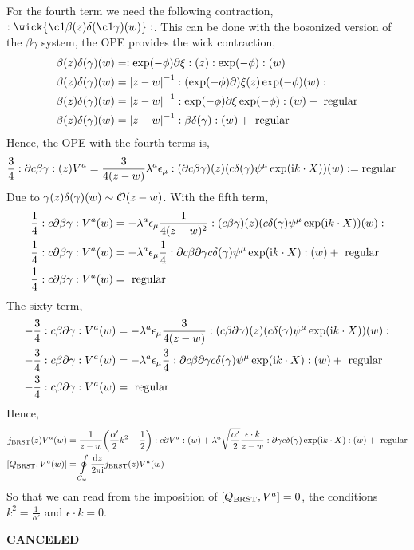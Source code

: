 For the fourth term we need the following contraction, $\cnord{\wick{\c1\beta(z)\delta\qty(\c1\gamma)(w)}}$. This can be done with the bosonized version 
of the $\beta\gamma$ system, the OPE provides the wick contraction,
\begin{align*}
    \beta(z)\delta\qty(\gamma)(w)&=:\exp(-\phi)\partial\xi:(z):\exp(-\phi):(w)\\
    \beta(z)\delta\qty(\gamma)(w)&=\abs{z-w}^{-1}:(\exp(-\phi)\partial)\xi(z)\exp(-\phi)(w):\\
    \beta(z)\delta\qty(\gamma)(w)&=\abs{z-w}^{-1}:\exp(-\phi)\partial\xi\exp(-\phi):(w)+\textnormal{ regular}\\
    \beta(z)\delta\qty(\gamma)(w)&=\abs{z-w}^{-1}:\beta\delta\qty(\gamma):(w)+\textnormal{ regular}
\end{align*}
Hence, the OPE with the fourth terms is,
\begin{align*}
    \frac34:\partial c\beta\gamma:(z)V^a&=\frac{3}{4(z-w)}\lambda^a\epsilon_\mu:(\partial c\beta\gamma)(z)(c\delta\qty(\gamma)\psi^\mu\exp(\textnormal{i} k\cdot X))(w):=\textnormal{regular}
\end{align*}
Due to $\gamma(z)\delta\qty(\gamma)(w)\sim\mathcal O\qty(z-w)$. With the fifth term,
\begin{align*}
    \frac14:c\partial\beta\gamma:V^a(w)&=-\lambda^a\epsilon_\mu\frac{1}{4(z-w)^2}:(c\beta\gamma)(z)(c\delta\qty(\gamma)\psi^\mu\exp(\textnormal{i} k\cdot X))(w):\\
    \frac14:c\partial\beta\gamma:V^a(w)&=-\lambda^a\epsilon_\mu\frac{1}{4}:\partial c\beta\partial\gamma c\delta\qty(\gamma)\psi^\mu\exp(\textnormal{i} k\cdot X):(w)+\textnormal{ regular}\\
    \frac14:c\partial\beta\gamma:V^a(w)&=\textnormal{ regular}
\end{align*}
The sixty term,
\begin{align*}
    -\frac34:c\beta\partial\gamma:V^a(w)&=-\lambda^a\epsilon_\mu\frac{3}{4(z-w)}:(c\beta\partial\gamma)(z)(c\delta\qty(\gamma)\psi^\mu\exp(\textnormal{i} k\cdot X))(w):\\
    -\frac34:c\beta\partial\gamma:V^a(w)&=-\lambda^a\epsilon_\mu\frac{3}{4}:\partial c\beta\partial\gamma c\delta\qty(\gamma)\psi^\mu\exp(\textnormal{i} k\cdot X):(w)+\textnormal{ regular}\\
    -\frac34:c\beta\partial\gamma:V^a(w)&=\textnormal{ regular}
\end{align*}
Hence,
\begin{align*}
    j_{\textnormal{BRST}}(z)V^a(w)&=\frac{1}{z-w}\qty(\frac{\alpha'}{2}k^2-\frac12)\cnord{c\partial V^a}(w)+\lambda^a\sqrt{\frac{\alpha'}{2}}\frac{\epsilon\cdot k}{z-w}\cnord{\partial\gamma c\delta(\gamma)\exp(\im k\cdot X)}(w)+\textnormal{ regular}\\
    \comm{Q_{\textnormal{BRST}}}{V^a(w)}&=\oint\limits_{C_w}\frac{\dd{z}}{2\pi\im}j_{\textnormal{BRST}}(z)V^a(w)
\end{align*}
So that we can read from the imposition of $\comm{Q_{\textnormal{BRST}}}{V^a}=0$, the conditions $k^2=\frac{1}{\alpha'}$ and $\epsilon\cdot k=0$.

\probitem{}

\textbf{CANCELED}

\probitem{}
\probitem{}